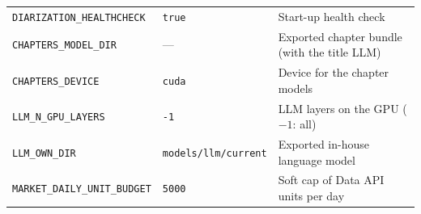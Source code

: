 \documentclass[ENG]{TFUOC}
\begin{document}
\begin{table}[H]
\begin{tabular}{@{}llp{5.6cm}@{}}
\texttt{DIARIZATION\_HEALTHCHECK}          & \texttt{true}            & Start-up health check \\
\texttt{CHAPTERS\_MODEL\_DIR}              & ---                      & Exported chapter bundle (with the title LLM) \\
\texttt{CHAPTERS\_DEVICE}                  & \texttt{cuda}            & Device for the chapter models \\
\texttt{LLM\_N\_GPU\_LAYERS}               & \texttt{-1}              & LLM layers on the GPU ($-1$: all) \\
\texttt{LLM\_OWN\_DIR}                     & \texttt{models/llm/current} & Exported in-house language model \\
\texttt{MARKET\_DAILY\_UNIT\_BUDGET}       & \texttt{5000}            & Soft cap of Data API units per day \\
\bottomrule
\end{tabular}
\end{table}
\end{document}
